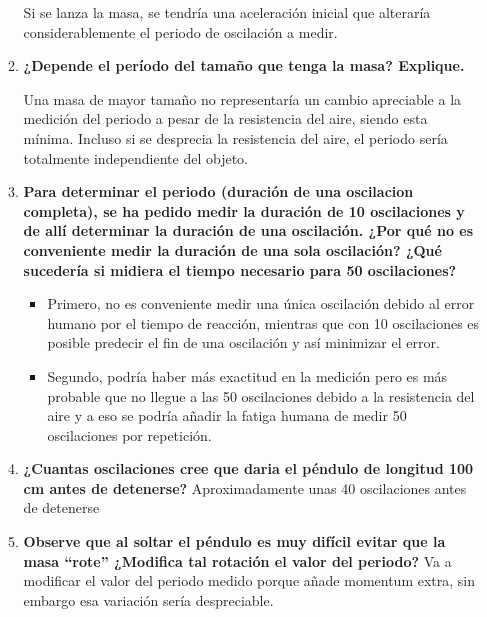 \begin{enumerate}
\begin{enumerate}
    Si se lanza la masa, se tendría una aceleración inicial que alteraría considerablemente el periodo de oscilación a medir.
    \item \textbf{¿Depende el per\'iodo del tamaño que tenga la masa? Explique.}

    
Una masa de mayor tamaño no representaría un cambio apreciable a la medición del periodo a pesar de la resistencia del aire, siendo esta mínima. Incluso si se desprecia la resistencia del aire, el periodo sería totalmente independiente del objeto.
    \item \textbf{Para determinar el periodo (duración de una oscilacion completa), se ha pedido medir la duración de 10 oscilaciones y de allí determinar la duración de una oscilación. ¿Por qué no es conveniente medir la duración de una sola oscilación? ¿Qué sucedería si midiera el tiempo necesario para 50 oscilaciones?}
    \begin{itemize}
        \item Primero, no es conveniente medir una única oscilación debido al error humano por el tiempo de reacción, mientras que con 10 oscilaciones es posible predecir el fin de una oscilación y así minimizar el error.
        \item Segundo, podría haber más exactitud en la medición pero es más probable que no llegue a las 50 oscilaciones debido a la resistencia del aire y a eso se podría añadir la fatiga humana de medir 50 oscilaciones por repetición. 
    \end{itemize}

    \item \textbf{¿Cuantas oscilaciones cree que daria el péndulo de longitud 100 cm antes de detenerse?}
Aproximadamente unas 40 oscilaciones antes de detenerse  
    \item \textbf{Observe que al soltar el p\'endulo es muy dif\'icil evitar que la masa “rote” ¿Modifica tal rotaci\'on el valor del periodo?}
Va a modificar el valor del periodo medido porque añade momentum extra, sin embargo esa variación sería despreciable. 

\end{enumerate}

\end{enumerate}
